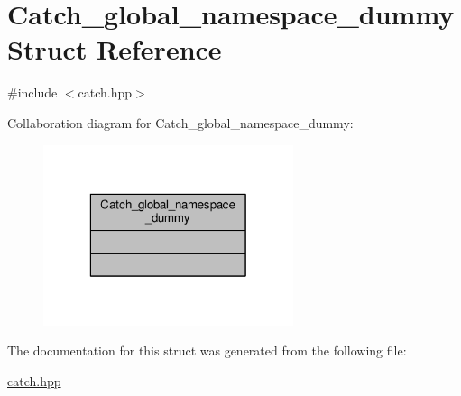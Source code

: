 \hypertarget{struct_catch__global__namespace__dummy}{\section{Catch\-\_\-global\-\_\-namespace\-\_\-dummy Struct Reference}
\label{struct_catch__global__namespace__dummy}
}


{\ttfamily \#include $<$catch.\-hpp$>$}



Collaboration diagram for Catch\-\_\-global\-\_\-namespace\-\_\-dummy\-:
\nopagebreak
\begin{figure}[H]
\begin{center}
\leavevmode
\includegraphics[width=208pt]{struct_catch__global__namespace__dummy__coll__graph}
\end{center}
\end{figure}


The documentation for this struct was generated from the following file\-:\begin{DoxyCompactItemize}
\item 
\hyperlink{catch_8hpp}{catch.\-hpp}\end{DoxyCompactItemize}
